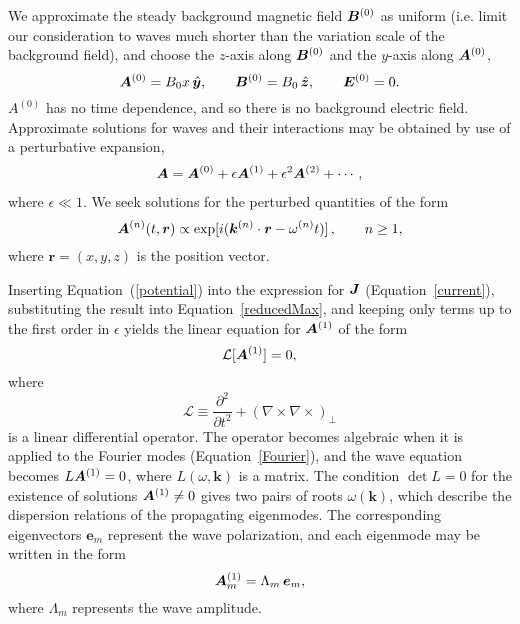 We approximate the steady background magnetic field $\boldsymbol{B}^{(0)}$ as uniform (i.e. limit our consideration to waves much shorter than the variation scale of the background field), and choose the $z$-axis along $\boldsymbol{B}^{(0)}$ and the $y$-axis along $\boldsymbol{A}^{(0)}$,
%
\begin{equation}
  \boldsymbol{A}^{(0)}=B_{0}x\,\hat{\boldsymbol{y}}, \qquad 
 \boldsymbol{B}^{(0)} = B_{0}\, \hat{\boldsymbol{z}},   \qquad \boldsymbol{E}^{(0)}=0.
\end{equation} 
%
$A^{(0)}$ has no time dependence, and so there is no background electric field.
Approximate solutions for waves and their interactions may be obtained by use of a perturbative expansion,
%
\begin{eqnarray}\label{pert}
	\boldsymbol{A} = \boldsymbol{A}^{(0)}
    +\epsilon \boldsymbol{A}^{(1)}+\epsilon^2\boldsymbol{A}^{(2)}+\cdots,
\end{eqnarray}
%
where $\epsilon\ll 1$.
We seek solutions for the perturbed quantities of the form 
%
\begin{equation}
\label{Fourier}
\boldsymbol{A}^{(n)}(t,\boldsymbol{r}) \propto \exp[i(\boldsymbol{k}^{(n)} \cdot \boldsymbol{r} - \omega^{(n)} t)]\, ,
 \qquad n\geq 1,
\end{equation}
%
where $\boldsymbol{r}=(x,y,z)$ is the position vector.

Inserting Equation~(\ref{potential}) into the expression for $\boldsymbol{J}$ (Equation~\ref{current}), substituting the result into Equation~\ref{reducedMax}, and keeping only terms up to the first order in $\epsilon$ yields the  linear equation for $\boldsymbol{A}^{(1)}$ of the form
%
\begin{equation}\label{Maxwell1}
   \mathcal{L}[\boldsymbol{A}^{(1)}]=0,
\end{equation} 
%
where 
%
\begin{equation}
  \mathcal{L}\equiv \frac{\partial^2}{\partial t^2} + (\nabla\times \nabla\times)_\perp
\end{equation}
%
is a linear differential operator. The operator becomes algebraic when it is applied to the Fourier modes (Equation~\ref{Fourier}), and the wave equation becomes $L\boldsymbol{A}^{(1)}=0$, where $L(\omega,\boldsymbol{k})$ is a matrix. The condition $\det L=0$ for the existence of solutions $\boldsymbol{A}^{(1)}\neq 0$ gives two pairs of roots $\omega(\boldsymbol{k})$, which describe the dispersion relations of the propagating eigenmodes. The corresponding eigenvectors $\boldsymbol{e}_m$ represent the wave polarization, and each eigenmode may be written in the form
%
\begin{equation}
  \boldsymbol{A}^{(1)}_m=\Lambda_m\,\boldsymbol{e}_m,
\end{equation}
%
where $\Lambda_m$ represents the wave amplitude.

